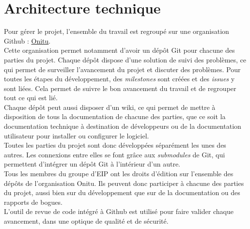 \section{Architecture technique}
Pour gérer le projet, l'ensemble du travail est regroupé sur une organisation Github : \href{https://github.com/onitu/}{Onitu}.\\

Cette organisation permet notamment d'avoir un dépôt Git pour chacune des parties du projet. Chaque dépôt dispose d'une solution de suivi des problèmes, ce qui permet de surveiller l'avancement du projet et discuter des problèmes.
Pour toutes les étapes du développement, des \textit{milestones} sont créées et des \textit{issues} y sont liées. Cela permet de suivre le bon avancement du travail et de regrouper tout ce qui est lié.\\

Chaque dépôt peut aussi disposer d'un wiki, ce qui permet de mettre à disposition de tous la documentation de chacune des parties, que ce soit la documentation technique à destination de développeurs ou de la documentation utilisateur pour installer ou configurer le logiciel.\\

Toutes les parties du projet sont donc développées séparément les unes des autres. Les connexions entre elles se font grâce aux \textit{submodules} de Git, qui permettent d'intégrer un dépôt Git à l'intérieur d'un autre.\\

Tous les membres du groupe d'EIP ont les droits d'édition sur l'ensemble des dépôts de l'organisation Onitu. Ils peuvent donc participer à chacune des parties du projet, aussi bien sur du développement que sur de la documentation ou des rapports de bogues.\\

L'outil de revue de code intégré à Github est utilisé pour faire valider chaque avancement, dans une optique de qualité et de sécurité.
